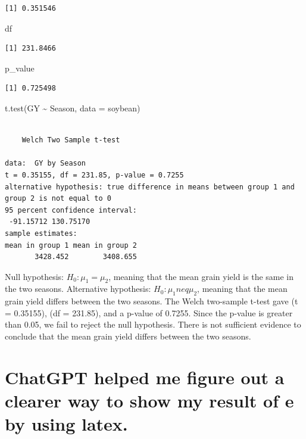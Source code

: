\documentclass[
  letterpaper,
  DIV=11,
  numbers=noendperiod]{scrartcl}
\newenvironment{Shaded}{\begin{snugshade}}{\end{snugshade}}
\newcommand{\AttributeTok}[1]{\textcolor[rgb]{0.40,0.45,0.13}{#1}}
\newcommand{\FunctionTok}[1]{\textcolor[rgb]{0.28,0.35,0.67}{#1}}
\newcommand{\NormalTok}[1]{\textcolor[rgb]{0.00,0.23,0.31}{#1}}
\newcommand{\SpecialCharTok}[1]{\textcolor[rgb]{0.37,0.37,0.37}{#1}}
\begin{document}
\begin{verbatim}
[1] 0.351546
\end{verbatim}

\begin{Shaded}
\begin{Highlighting}[]
\NormalTok{df}
\end{Highlighting}
\end{Shaded}

\begin{verbatim}
[1] 231.8466
\end{verbatim}

\begin{Shaded}
\begin{Highlighting}[]
\NormalTok{p\_value}
\end{Highlighting}
\end{Shaded}

\begin{verbatim}
[1] 0.725498
\end{verbatim}

\begin{Shaded}
\begin{Highlighting}[]
\FunctionTok{t.test}\NormalTok{(GY }\SpecialCharTok{\textasciitilde{}}\NormalTok{ Season, }\AttributeTok{data =}\NormalTok{ soybean)}
\end{Highlighting}
\end{Shaded}

\begin{verbatim}

    Welch Two Sample t-test

data:  GY by Season
t = 0.35155, df = 231.85, p-value = 0.7255
alternative hypothesis: true difference in means between group 1 and group 2 is not equal to 0
95 percent confidence interval:
 -91.15712 130.75170
sample estimates:
mean in group 1 mean in group 2 
       3428.452        3408.655 
\end{verbatim}

Null hypothesis: \(H_0: \mu_1 = \mu_2\), meaning that the mean grain
yield is the same in the two seasons. Alternative hypothesis:
\(H_0: \mu_1 neq \mu_2\), meaning that the mean grain yield differs
between the two seasons. The Welch two-sample t-test gave (t = 0.35155),
(df = 231.85), and a p-value of 0.7255. Since the p-value is greater
than 0.05, we fail to reject the null hypothesis. There is not
sufficient evidence to conclude that the mean grain yield differs
between the two seasons.

\section{ChatGPT helped me figure out a clearer way to show my result of
e by using
latex.}\label{chatgpt-helped-me-figure-out-a-clearer-way-to-show-my-result-of-e-by-using-latex.}
\end{document}
